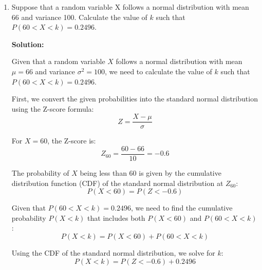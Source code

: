 \documentclass[12pt]{article}
\begin{document}
\begin{enumerate}
{\begin{align*}
	z_1 &= \frac{485,000 - 500,000}{15,000} = -1, \\
	z_2 &= \frac{530,000 - 500,000}{15,000} = 2.
\end{align*}

The desired probability is then given by the area under the standard normal curve between $z_1$ and $z_2$, which can be found using a standard normal table or using software such as R. 

Using a standard normal table, we find that $F(-1) = 0.1587$ and $F(2) = 0.9772$, so the desired probability is $0.9772 - 0.1587 = 0.8185$.

Therefore, the probability that the value of the portfolio is between €485,000 and €530,000 is 0.8185.

Here, we will use R to calculate the probability:

\begin{lstlisting}[language=R, basicstyle=\ttfamily]
z1 <- -1
z2 <- 2
pnorm(z2) - pnorm(z1)
\end{lstlisting}


}

\item   Suppose that a random variable X follows a normal distribution with mean 66 and variance 100. Calculate the value of $k$ such that $P(60<X<k)=0.2496$.

{\color{blue}
\noindent \textbf{Solution:}

Given that a random variable $X$ follows a normal distribution with mean $\mu = 66$ and variance $\sigma^2 = 100$, we need to calculate the value of $k$ such that $P(60 < X < k) = 0.2496$.

First, we convert the given probabilities into the standard normal distribution using the Z-score formula:
\[ Z = \frac{X - \mu}{\sigma} \]

For $X = 60$, the Z-score is:
\[ Z_{60} = \frac{60 - 66}{10} = -0.6 \]

The probability of $X$ being less than 60 is given by the cumulative distribution function (CDF) of the standard normal distribution at $Z_{60}$:
\[ P(X < 60) = P(Z < -0.6) \]

Given that $P(60 < X < k) = 0.2496$, we need to find the cumulative probability $P(X < k)$ that includes both $P(X < 60)$ and $P(60 < X < k)$:
\[ P(X < k) = P(X < 60) + P(60 < X < k) \]

Using the CDF of the standard normal distribution, we solve for $k$:
\[ P(X < k) = P(Z < -0.6) + 0.2496 \]

}
\end{enumerate}
\end{document}
